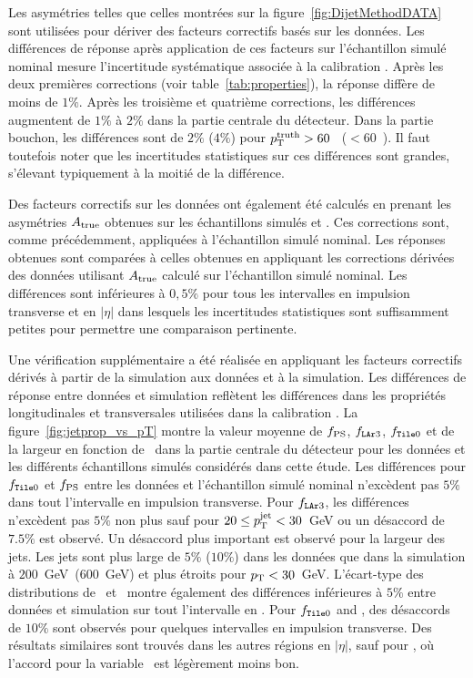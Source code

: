 Les asym\'etries telles que celles montr\'ees sur la figure~\ref{fig:DijetMethodDATA} sont utilis\'ees pour d\'eriver des facteurs correctifs bas\'es sur les donn\'ees. Les diff\'erences de r\'eponse apr\`es application de ces facteurs sur l'échantillon simul\'e nominal mesure l'incertitude syst\'ematique associ\'ee \`a la calibration \GS. Apr\`es les deux premi\`eres corrections (voir table~\ref{tab:properties}), la r\'eponse diff\`ere de moins de $1\%$. Apr\`es les troisi\`eme et quatri\`eme corrections, les diff\'erences augmentent de $1 \%$ \`a $2 \%$ dans la partie centrale du d\'etecteur. Dans la partie bouchon, les diff\'erences sont de $2 \%$ ($4 \%$) pour $p_{\mathrm{T}}^{\rm truth} > 60$~\GeV{} ($ < 60$~\GeV). Il faut toutefois noter que les incertitudes statistiques sur ces diff\'erences sont grandes, s'\'elevant typiquement \`a la moiti\'e de la diff\'erence.

Des facteurs correctifs sur les donn\'ees ont \'egalement \'et\'e calcul\'es en prenant les asym\'etries $A_{\rm true}$ obtenues sur les \'echantillons simul\'es  et \herwigpp. Ces corrections sont, comme pr\'ec\'edemment, appliqu\'ees \`a l'\'echantillon simul\'e nominal. Les r\'eponses obtenues sont compar\'ees \`a celles obtenues en appliquant les corrections d\'eriv\'ees des donn\'ees utilisant $A_{\rm true}$ calcul\'e sur l'\'echantillon simul\'e nominal. Les diff\'erences sont inf\'erieures \`a $0,5 \%$ pour tous les intervalles en impulsion transverse et en $|\eta|$ dans lesquels les incertitudes statistiques sont suffisamment petites pour permettre une comparaison pertinente.

Une vérification supplémentaire a été réalisée en appliquant les facteurs correctifs dérivés à partir de la simulation aux données et à la simulation. Les différences de r\'eponse entre données et simulation reflètent les différences dans les propriétés longitudinales et transversales utilisées dans la calibration \GS. La figure~\ref{fig:jetprop_vs_pT} montre la valeur moyenne de $f_{\rm PS}$, $f_{\texttt{LAr} 3}$, $f_{\texttt{Tile} 0}$ et de la largeur en fonction de \ptjet~dans la partie centrale du détecteur pour les données et les différents échantillons simulés considérés dans cette étude. Les différences pour $f_{\texttt{Tile} 0}$ et $f_{\rm PS}$ entre les données et l'échantillon simulé nominal n'excèdent pas $5 \%$ dans tout l'intervalle en impulsion transverse. Pour $f_{\texttt{LAr} 3}$, les différences n'excèdent pas $5 \%$ non plus sauf pour $20 \le p_{\mathrm{T}}^\mathrm{jet} < 30$~GeV ou un désaccord de $7.5 \%$ est observé. Un désaccord plus important est observé pour la largeur des jets. Les jets sont plus large de $5 \%$ ($10 \%$) dans les données que dans la simulation à $200$~GeV~($600$~GeV) et plus étroits pour $p_{\mathrm{T}} < 30$~GeV. 
\enlargethispage{0.3cm}
L'écart-type des distributions de \fem~et \fpres~montre également des différences inférieures à $5 \%$ entre données et simulation sur tout l'intervalle en \ptjet. Pour $f_{\texttt{Tile} 0}$ and \width, des désaccords de $10 \%$ sont observés pour quelques intervalles en impulsion transverse. Des résultats similaires sont trouvés dans les autres régions en $|\eta|$, sauf pour , où l'accord pour la variable \width~est légèrement moins bon.

